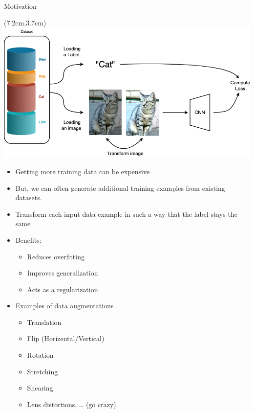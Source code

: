 \documentclass[serif, aspectratio=169]{beamer}
\begin{document}
\begin{frame}{Motivation}
	\begin{textblock*}{5cm}(7.2cm,3.7cm) %
		\includegraphics[keepaspectratio, scale=0.28]{pic/cnnaug}
	\end{textblock*}
	
	\begin{itemize}
		\item Getting more training data can be expensive
		\item But, we can often generate additional training examples from existing datasets.
		\item Transform each input data example in such a way that the label stays the same
		\item Benefits:
		\begin{itemize}
			\item Reduces overfitting 
			\item Improves generalization
			\item Acts as a regularization
		\end{itemize}
		\item Examples of data augmentations
		\begin{itemize}
			\item Translation
			\item Flip (Horizental/Vertical)
			\item Rotation
			\item Stretching
			\item Shearing
			\item Lens distortions, … (go crazy)
		\end{itemize}
	\end{itemize}
\end{frame}
\end{document}

